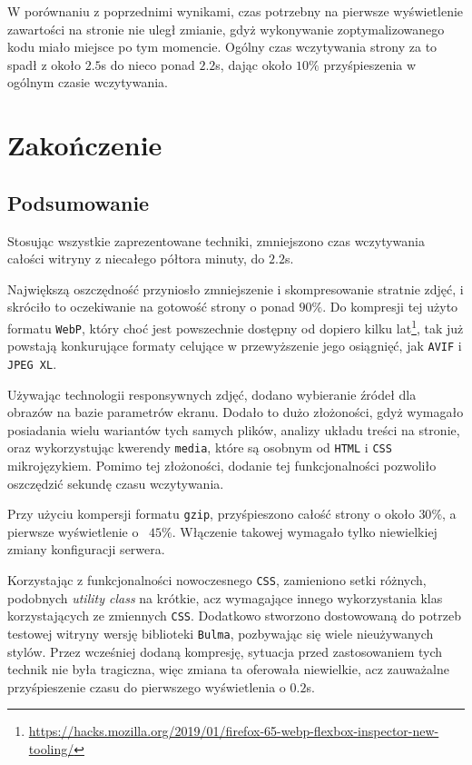 \documentclass[licencjacka]{pracadypl}
\begin{document}
W porównaniu z poprzednimi wynikami, czas potrzebny na pierwsze wyświetlenie zawartości na stronie nie uległ zmianie, gdyż wykonywanie zoptymalizowanego kodu miało miejsce po tym momencie. Ogólny czas wczytywania strony za to spadł z około $2.5$s do nieco ponad $2.2$s, dając około $10\%$ przyśpieszenia w ogólnym czasie wczytywania.

\chapter{Zakończenie}

\section{Podsumowanie}

Stosując wszystkie zaprezentowane techniki, zmniejszono czas wczytywania całości witryny z niecałego półtora minuty, do $2.2$s. 

Największą oszczędność przyniosło zmniejszenie i skompresowanie stratnie zdjęć, i skróciło to oczekiwanie na gotowość strony o ponad $90\%$. Do kompresji tej użyto formatu \texttt{WebP}, który choć jest powszechnie dostępny od dopiero kilku lat\footnote{\url{https://hacks.mozilla.org/2019/01/firefox-65-webp-flexbox-inspector-new-tooling/}}, tak już powstają konkurujące formaty celujące w przewyższenie jego osiągnięć, jak \texttt{AVIF} i \texttt{JPEG XL}.

Używając technologii responsywnych zdjęć, dodano wybieranie źródeł dla obrazów na bazie parametrów ekranu. Dodało to dużo złożoności, gdyż wymagało posiadania wielu wariantów tych samych plików, analizy układu treści na stronie, oraz wykorzystując kwerendy \texttt{media}, które są osobnym od \texttt{HTML} i \texttt{CSS} mikrojęzykiem. Pomimo tej złożoności, dodanie tej funkcjonalności pozwoliło oszczędzić sekundę czasu wczytywania.

Przy użyciu kompersji formatu \texttt{gzip}, przyśpieszono całość strony o około $30\%$, a pierwsze wyświetlenie o ~$45\%$. Włączenie takowej wymagało tylko niewielkiej zmiany konfiguracji serwera.

Korzystając z funkcjonalności nowoczesnego \texttt{CSS}, zamieniono setki różnych, podobnych \emph{utility class} na krótkie, acz wymagające innego wykorzystania klas korzystających ze zmiennych \texttt{CSS}. Dodatkowo stworzono dostowowaną do potrzeb testowej witryny wersję biblioteki \texttt{Bulma}, pozbywając się wiele nieużywanych stylów. Przez wcześniej dodaną kompresję, sytuacja przed zastosowaniem tych technik nie była tragiczna, więc zmiana ta oferowała niewielkie, acz zauważalne przyśpieszenie czasu do pierwszego wyświetlenia o $0.2$s.
\end{document}
